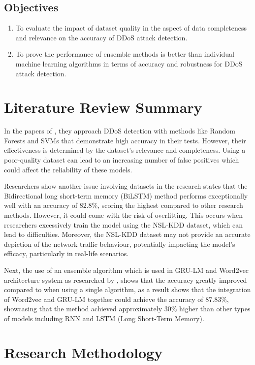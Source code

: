 \documentclass[a4paper, 12pt]{article}
\begin{document}
\subsection{Objectives}
\begin{enumerate}
  \item To evaluate the impact of dataset quality in the aspect of data completeness and relevance on the accuracy of DDoS attack detection.
  \item To prove the performance of ensemble methods is better than individual machine learning algorithms in terms of accuracy and robustness for DDoS attack detection. 
\end{enumerate}

\section{Literature Review Summary}

In the papers of , they approach DDoS detection with methods like Random Forests and SVMs that demonstrate high accuracy in their tests. However, their effectiveness is determined by the dataset's relevance and completeness. Using a poor-quality dataset can lead to an increasing number of false positives which could affect the reliability of these models.

Researchers show another issue involving datasets in the research  states that the Bidirectional long short-term memory (BiLSTM) method performs exceptionally well with an accuracy of 82.8\%, scoring the highest compared to other research methods. However, it could come with the risk of overfitting. This occurs when researchers excessively train the model using the NSL-KDD dataset, which can lead to difficulties. Moreover, the NSL-KDD dataset may not provide an accurate depiction of the network traffic behaviour, potentially impacting the model’s efficacy, particularly in real-life scenarios.

 Next, the use of an ensemble algorithm which is used in GRU-LM  and Word2vec architecture system as researched by , shows that the accuracy greatly improved compared to when using a single algorithm, as a result shows that the integration of Word2vec and GRU-LM together could achieve the accuracy of 87.83\%, showcasing that the method achieved approximately 30\% higher than other types of models including RNN and LSTM (Long Short-Term Memory). 

\clearpage

\section{Research Methodology}
\end{document}
